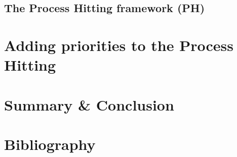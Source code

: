 \documentclass[fleqn,8pt,t]{beamer}
\begin{document}
\subsection{The Process Hitting framework (PH)}

%
%


\section{Adding priorities to the Process Hitting}




\section{Summary \& Conclusion}


\appendix
\section[x]{Bibliography}

%
\end{document}
